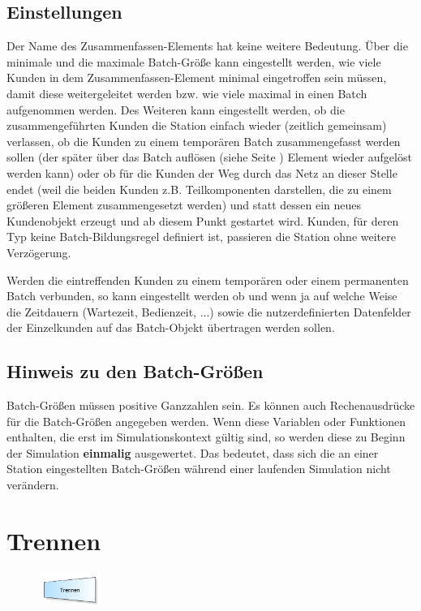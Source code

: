 \subsection*{Einstellungen}

Der Name des Zusammenfassen-Elements hat keine weitere Bedeutung. Über die minimale und die maximale Batch-Größe kann
eingestellt werden, wie viele Kunden in dem Zusammenfassen-Element minimal eingetroffen sein müssen, damit diese 
weitergeleitet werden bzw. wie viele maximal in einen Batch aufgenommen werden. Des Weiteren kann eingestellt werden,
ob die zusammengeführten Kunden die Station einfach wieder (zeitlich gemeinsam) verlassen, ob die Kunden zu einem temporären
Batch zusammengefasst werden sollen (der später über das Batch auflösen (siehe Seite \pageref{ref:ModelElementSeparate}) Element
wieder aufgelöst werden kann) oder ob für die Kunden der Weg durch
das Netz an dieser Stelle endet (weil die beiden Kunden z.B. Teilkomponenten darstellen, die zu einem größeren Element
zusammengesetzt werden) und statt dessen ein neues Kundenobjekt erzeugt und ab diesem Punkt gestartet wird.
Kunden, für deren Typ keine Batch-Bildungsregel definiert ist, passieren die Station ohne weitere Verzögerung.

Werden die eintreffenden Kunden zu einem temporären oder einem permanenten Batch verbunden, so kann eingestellt werden
ob und wenn ja auf welche Weise die Zeitdauern (Wartezeit, Bedienzeit, ...) sowie die nutzerdefinierten Datenfelder
der Einzelkunden auf das Batch-Objekt übertragen werden sollen.

\subsection*{Hinweis zu den Batch-Größen}

Batch-Größen müssen positive Ganzzahlen sein.
Es können auch Rechenausdrücke für die Batch-Größen angegeben werden.
Wenn diese Variablen oder Funktionen enthalten, die erst im Simulationskontext gültig sind, so werden diese zu Beginn der Simulation \textbf{einmalig} ausgewertet.
Das bedeutet, dass sich die an einer Station eingestellten Batch-Größen während einer laufenden Simulation nicht verändern.


\section{Trennen}
\label{ref:ModelElementSeparate}

\begin{figure}
\vspace{-22pt}
\includegraphics[width=2cm]{imageModelElementSeparate.png}
\vspace{-22pt}
\end{figure}

